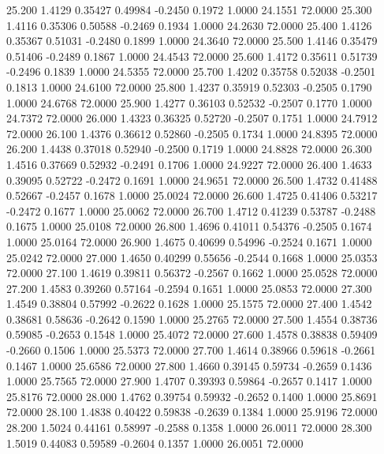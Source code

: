   25.200   1.4129   0.35427   0.49984  -0.2450   0.1972   1.0000  24.1551  72.0000
  25.300   1.4116   0.35306   0.50588  -0.2469   0.1934   1.0000  24.2630  72.0000
  25.400   1.4126   0.35367   0.51031  -0.2480   0.1899   1.0000  24.3640  72.0000
  25.500   1.4146   0.35479   0.51406  -0.2489   0.1867   1.0000  24.4543  72.0000
  25.600   1.4172   0.35611   0.51739  -0.2496   0.1839   1.0000  24.5355  72.0000
  25.700   1.4202   0.35758   0.52038  -0.2501   0.1813   1.0000  24.6100  72.0000
  25.800   1.4237   0.35919   0.52303  -0.2505   0.1790   1.0000  24.6768  72.0000
  25.900   1.4277   0.36103   0.52532  -0.2507   0.1770   1.0000  24.7372  72.0000
  26.000   1.4323   0.36325   0.52720  -0.2507   0.1751   1.0000  24.7912  72.0000
  26.100   1.4376   0.36612   0.52860  -0.2505   0.1734   1.0000  24.8395  72.0000
  26.200   1.4438   0.37018   0.52940  -0.2500   0.1719   1.0000  24.8828  72.0000
  26.300   1.4516   0.37669   0.52932  -0.2491   0.1706   1.0000  24.9227  72.0000
  26.400   1.4633   0.39095   0.52722  -0.2472   0.1691   1.0000  24.9651  72.0000
  26.500   1.4732   0.41488   0.52667  -0.2457   0.1678   1.0000  25.0024  72.0000
  26.600   1.4725   0.41406   0.53217  -0.2472   0.1677   1.0000  25.0062  72.0000
  26.700   1.4712   0.41239   0.53787  -0.2488   0.1675   1.0000  25.0108  72.0000
  26.800   1.4696   0.41011   0.54376  -0.2505   0.1674   1.0000  25.0164  72.0000
  26.900   1.4675   0.40699   0.54996  -0.2524   0.1671   1.0000  25.0242  72.0000
  27.000   1.4650   0.40299   0.55656  -0.2544   0.1668   1.0000  25.0353  72.0000
  27.100   1.4619   0.39811   0.56372  -0.2567   0.1662   1.0000  25.0528  72.0000
  27.200   1.4583   0.39260   0.57164  -0.2594   0.1651   1.0000  25.0853  72.0000
  27.300   1.4549   0.38804   0.57992  -0.2622   0.1628   1.0000  25.1575  72.0000
  27.400   1.4542   0.38681   0.58636  -0.2642   0.1590   1.0000  25.2765  72.0000
  27.500   1.4554   0.38736   0.59085  -0.2653   0.1548   1.0000  25.4072  72.0000
  27.600   1.4578   0.38838   0.59409  -0.2660   0.1506   1.0000  25.5373  72.0000
  27.700   1.4614   0.38966   0.59618  -0.2661   0.1467   1.0000  25.6586  72.0000
  27.800   1.4660   0.39145   0.59734  -0.2659   0.1436   1.0000  25.7565  72.0000
  27.900   1.4707   0.39393   0.59864  -0.2657   0.1417   1.0000  25.8176  72.0000
  28.000   1.4762   0.39754   0.59932  -0.2652   0.1400   1.0000  25.8691  72.0000
  28.100   1.4838   0.40422   0.59838  -0.2639   0.1384   1.0000  25.9196  72.0000
  28.200   1.5024   0.44161   0.58997  -0.2588   0.1358   1.0000  26.0011  72.0000
  28.300   1.5019   0.44083   0.59589  -0.2604   0.1357   1.0000  26.0051  72.0000
